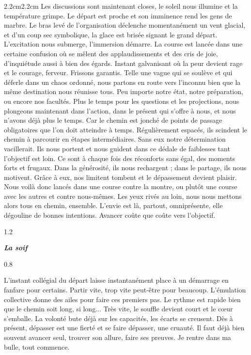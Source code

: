 \begin{adjustwidth}{2.2cm}{2.2cm}
Les discussions sont maintenant closes, le soleil nous illumine et la température grimpe. Le départ est proche et son imminence rend les gens de marbre. Le bras levé de l’organisation déclenche momentanément un vent glacial, et d’un coup sec symbolique, la glace est brisée signant le grand départ. L’excitation nous submerge, l’immersion démarre. La course est lancée dans une certaine confusion où se mêlent des applaudissements et des cris de joie, d’inquiétude aussi à bien des égards. Instant galvanisant où la peur devient rage et le courage, ferveur. Frissons garantis. Telle une vague qui se soulève et qui déferle dans un chaos ordonné, nous partons en route vers l’inconnu bien que la même destination nous réunisse tous. Peu importe notre état, notre préparation, ou encore nos facultés. Plus le temps pour les questions et les projections, nous plongeons maintenant dans l’action, dans le présent qui s’offre à nous, et nous n’avons déjà plus le temps. Car le chemin est jonché de points de passage obligatoires que l’on doit atteindre à temps. Régulièrement espacés, ils scindent le chemin à parcourir en étapes intermédiaires. Sans eux notre détermination vacillerait. Ils nous portent et nous guident dans ce dédale de faiblesses tant l’objectif est loin. Ce sont à chaque fois des réconforts sans égal, des moments forts et frugaux. Dans la générosité, ils nous rechargent ; dans le partage, ils nous motivent. Grâce à eux, nos limitent tombent et le dépassement devient plaisir.
Nous voilà donc lancés dans une course contre la montre, ou plutôt une course avec les autres et contre nous-mêmes. Les yeux rivés au loin, nous nous mettons alors tous en chemin, ensemble. L’envie est là, partout, omniprésente, elle dégouline de bonnes intentions. Avancer coûte que coûte vers l’objectif.
\begin{spacing}{1.2}
~
\end{spacing}
\begin{center}
\textbf{\textit{La soif}}
\end{center}
\begin{spacing}{0.8}
~
\end{spacing}
L’instant collégial du départ laisse instantanément place à un démarrage en fanfare pour certains. Partir vite, trop vite peut-être pour beaucoup. L’émulation collective donne des ailes pour faire ces premiers pas. Le rythme est rapide bien que le chemin soit long, si long... Très vite, le souffle devient court et le cœur s’emballe. La volonté bute déjà sur les capacités, les écarts se creusent. Dès à présent, dépasser est une fierté et se faire dépasser, une cruauté. Il faut déjà bien souvent avancer seul, trouver son allure, faire ses preuves. Je rentre dans ma bulle, tout commence.


\end{adjustwidth}
